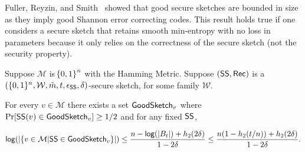 Fuller, Reyzin, and Smith~\cite[Lemma 7.3]{fuller2020fuzzy} showed that good secure sketches are bounded in size as they imply good Shannon error correcting codes.  This result holds true if one considers a secure sketch that retains smooth min-entropy with no loss in parameters because it only relies on the correctness of the secure sketch (not the security property).  

\begin{lemma}
\label{lem:smallgeneralviable ss}
    Suppose $\mathcal{M}$ is $\!\left\{ 0,1 \right\}^{n}$ with the Hamming Metric. Suppose $({\mathsf{SS}}, {\mathsf{Rec}})$ is a $(\{0, 1\}^n, \mathcal{W}, \tilde{m}, t, \epsilon_{\mathsf{SS}}, \delta)$-secure sketch, for some family $\mathcal{W}$. 
    
   For every $v\in \mathcal{M}$ there exists a set $\mathsf{GoodSketch}_v$ where $\Pr[{\mathsf{SS}}(v)\in \mathsf{GoodSketch}_v] \ge 1/2$ and for any fixed ${\mathsf{SS}}$,
    
    \[
    \mathsf{log}\!\left(|\{v \in \mathcal{M} | {\mathsf{SS}} \in \mathsf{GoodSketch}_v\}|\right) \le \frac{n - \mathsf{log}\!\left(|B_t|\right) +h_2(2\delta)}{1-2\delta} \le \frac{n(1-h_2(t/n)) +h_2(2\delta)}{1-2\delta}.
    \]
\end{lemma}


